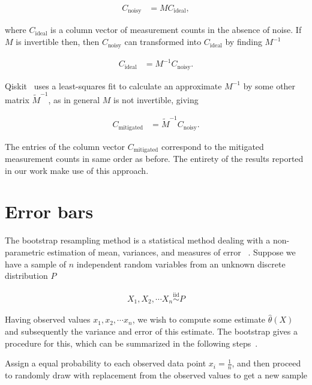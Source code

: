 \begin{align}
  C_\text{noisy} &= M C_\text{ideal},
\end{align}

\noindent
where $C_\text{ideal}$ is a column vector of measurement counts in the absence of noise. If $M$ is invertible then, then $C_\text{noisy}$  can transformed into $C_\text{ideal}$ by finding $M^{-1}$

\begin{align}
  C_\text{ideal} &=  M^{-1}C_\text{noisy}.
\end{align}

\noindent
Qiskit~\cite{Qiskit_errormit} uses a least-squares fit to calculate an approximate $M^{-1}$ by some other matrix $\tilde{M}^{-1}$, as in general $M$ is not invertible, giving

\begin{align}
  C_\text{mitigated} &=  \tilde{M}^{-1}C_\text{noisy}.
\end{align}

\noindent
The entries of the column vector $C_\text{mitigated}$ correspond to the mitigated measurement counts in same order as before. The entirety of the results reported in our work make use of this approach.

\clearpage
\section{Error bars}

The bootstrap resampling method is a statistical method dealing with a non-parametric estimation of mean, variances, and  measures of error
~\cite{Efron_1979,Efron_1982}. Suppose we have a sample of $n$ independent random variables from an unknown discrete distribution $P$

\begin{align}
    X_1, X_2 , \cdots X_n \stackrel{\text{iid}}{\sim} P
\end{align}

\noindent
Having observed values $x_1, x_2, \cdots x_n$, we wish to compute some estimate $\hat{\theta}(X)$ and subsequently the variance and error of this estimate. The bootstrap gives a procedure for this, which can be summarized in the following steps~\cite{Efron_1979,Efron_1982}.

\bigskip
\noindent
Assign a equal probability to each observed data point $x_i = \frac{1}{n}$, and then proceed to randomly draw with replacement from the observed values to get a new sample

